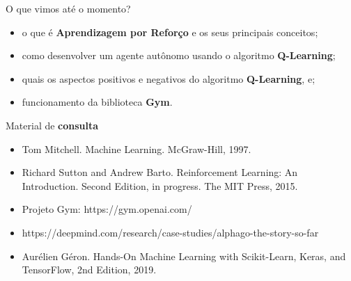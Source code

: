\documentclass{beamer}
\begin{document}
\begin{frame}{O que vimos até o momento?}
\begin{itemize}
	\item o que é \textbf{Aprendizagem por Reforço} e os seus principais conceitos;
	\item como desenvolver um agente autônomo usando o algoritmo \textbf{Q-Learning};
	\item quais os aspectos positivos e negativos do algoritmo \textbf{Q-Learning}, e;
	\item funcionamento da biblioteca \textbf{Gym}. 
\end{itemize}
\end{frame}

\begin{frame}{Material de \textbf{consulta}}
\begin{itemize}
  \item Tom Mitchell. Machine Learning. McGraw-Hill, 1997.
  \item Richard Sutton and Andrew Barto. Reinforcement Learning: An Introduction. Second Edition, in progress. The MIT Press, 2015.
  \item Projeto Gym: https://gym.openai.com/
  \item https://deepmind.com/research/case-studies/alphago-the-story-so-far
  \item Aurélien Géron. Hands-On Machine Learning with Scikit-Learn, Keras, and TensorFlow, 2nd Edition, 2019. 
\end{itemize}
\end{frame}
\end{document}
